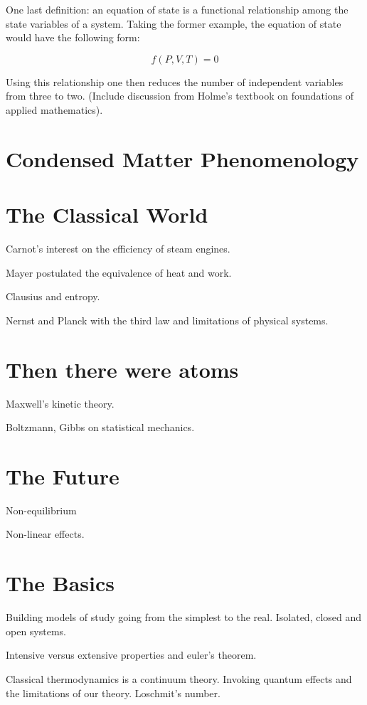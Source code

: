 \documentclass[10pt,twoside,openright]{memoir}
\begin{document}
One last definition: an equation of state is a functional relationship among the state variables of a system.
Taking the former example, the equation of state would have the following form:

\begin{equation}
f \left( P, V, T \right) = 0
\end{equation}

Using this relationship one then reduces the number of independent variables from three to two. (Include discussion from Holme's textbook on foundations of applied mathematics).


\section{Condensed Matter Phenomenology}

\section{The Classical World}
Carnot's interest on the efficiency of steam engines.

Mayer postulated the equivalence of heat and work.

Clausius and entropy.

Nernst and Planck with the third law and limitations of physical systems.

\section{Then there were atoms}
Maxwell's kinetic theory.

Boltzmann, Gibbs on statistical mechanics.

\section{The Future}
Non-equilibrium

Non-linear effects.

\section{The Basics}

Building models of study going from the simplest to the real. Isolated, closed and open systems.


Intensive versus extensive properties and euler's theorem.


Classical thermodynamics is a continuum theory. Invoking quantum effects and the limitations of our theory. Loschmit's number.
\end{document}
